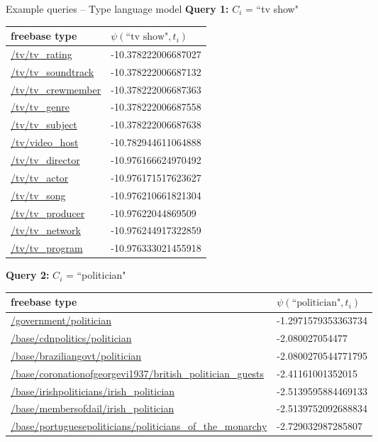 \documentclass[pdf,11pt]{beamer}
\begin{document}
\begin{frame}{Example queries -- Type language model}
\textbf{Query 1:} $C_i$ = ``tv show"
\begin{longtable}{| p{} | p{} |} 
\hline
\textbf{freebase type} & $\psi(\text{``tv show"}, t_i)$ \\ \hline \hline

\url{/tv/tv_rating} & -10.378222006687027 \\ \hline
\url{/tv/tv_soundtrack} & -10.378222006687132 \\ \hline
\url{/tv/tv_crewmember} & -10.378222006687363 \\ \hline
\url{/tv/tv_genre} & -10.378222006687558 \\ \hline
\url{/tv/tv_subject} & -10.378222006687638 \\ \hline
\url{/tv/video_host} & -10.782944611064888 \\ \hline
\url{/tv/tv_director} & -10.976166624970492 \\ \hline
\url{/tv/tv_actor} & -10.976171517623627 \\ \hline
\url{/tv/tv_song} & -10.976210661821304 \\ \hline
\url{/tv/tv_producer} & -10.97622044869509 \\ \hline
\url{/tv/tv_network} & -10.976244917322859 \\ \hline
\url{/tv/tv_program} & -10.976333021455918 \\ \hline

\end{longtable}
\end{frame}

\begin{frame}{}

\textbf{Query 2:} $C_{i}$ = ``politician"

\begin{longtable}{| p{} | p{} |} 
\hline
\textbf{freebase type} & $\psi(\text{``politician"}, t_i)$ \\ \hline \hline

\url{/government/politician} & -1.2971579353363734 \\ \hline
\url{/base/cdnpolitics/politician} & -2.080027054477 \\ \hline
\url{/base/braziliangovt/politician} & -2.0800270544771795 \\ \hline
\url{/base/coronationofgeorgevi1937/british_politician_guests} & -2.41161001352015 \\ \hline
\url{/base/irishpoliticians/irish_politician} & -2.5139595884469133 \\ \hline
\url{/base/membersofdail/irish_politician} & -2.5139752092688834 \\ \hline
\url{/base/portuguesepoliticians/politicians_of_the_monarchy} & -2.729032987285807 \\ \hline

\end{longtable}

\end{frame}
\end{document}
